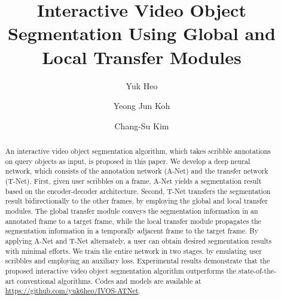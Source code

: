 \documentclass[runningheads]{llncs}
\begin{document}
\pagestyle{headings}
\mainmatter
\def\ECCVSubNumber{2729}  

\title{Interactive Video Object Segmentation Using Global and Local Transfer Modules} 

\begin{comment}
\titlerunning{ECCV-20 submission ID \ECCVSubNumber}
\authorrunning{ECCV-20 submission ID \ECCVSubNumber}
\author{Anonymous ECCV submission}
\institute{Paper ID \ECCVSubNumber}
\end{comment}


\author{Yuk Heo \and
Yeong Jun Koh \and
Chang-Su Kim}
\maketitle



\begin{abstract}
An interactive video object segmentation algorithm, which takes scribble annotations on query objects as input, is proposed in this paper. We develop a deep neural network, which consists of the annotation network (A-Net) and the transfer network (T-Net). First, given user scribbles on a frame, A-Net yields a segmentation result based on the encoder-decoder architecture. Second, T-Net transfers the segmentation result bidirectionally to the other frames, by employing the global and local transfer modules. The global transfer module conveys the segmentation information in an annotated frame to a target frame, while the local transfer module propagates the segmentation information in a temporally adjacent frame to the target frame. By applying A-Net and T-Net alternately, a user can obtain desired segmentation results with minimal efforts. We train the entire network in two stages, by emulating user scribbles and employing an auxiliary loss. Experimental results demonstrate that the proposed interactive video object segmentation algorithm outperforms the state-of-the-art conventional algorithms. Codes
and models are available at \href{https://github.com/yuk6heo/IVOS-ATNet}{https://github.com/yuk6heo/IVOS-ATNet}.
\end{abstract}
\end{document}
